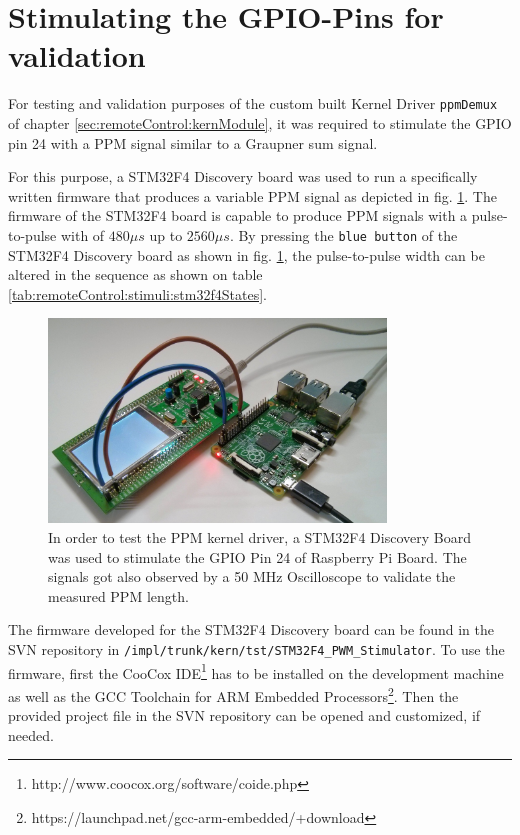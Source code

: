 \section{Stimulating the GPIO-Pins for validation}
\label{sec:remoteControl:stimuli}

For testing and validation purposes of the custom built Kernel Driver \texttt{ppmDemux} of chapter \ref{sec:remoteControl:kernModule}, it was required to stimulate the GPIO pin 24 with a PPM signal similar to a Graupner sum signal.

For this purpose, a STM32F4 Discovery board was used to run a specifically written firmware that produces a variable PPM signal as depicted in fig. \ref{fig:remoteControl:stimuli:hwSetup}. The firmware of the STM32F4 board is capable to produce PPM signals with a pulse-to-pulse with of $480\mu s$ up to $2560\mu s$. By pressing the \texttt{blue button} of the STM32F4 Discovery board as shown in fig. \ref{fig:remoteControl:stimuli:hwSetup}, the pulse-to-pulse width can be altered in the sequence as shown on table \ref{tab:remoteControl:stimuli:stm32f4States}.

\begin{figure}[H]
    \centering
    \includegraphics[width=0.80\textwidth]{fig/ch-ppm-kernel-driver/picStimulusRpi}
    \caption[Stimulating GPIO Pins of Raspberry Pi]{In order to test the PPM kernel driver, a STM32F4 Discovery Board was used to stimulate the GPIO Pin 24 of Raspberry Pi Board. The signals got also observed by a 50 MHz Oscilloscope to validate the measured PPM length.}
    \label{fig:remoteControl:stimuli:hwSetup}
\end{figure}

The firmware developed for the STM32F4 Discovery board can be found in the SVN repository in \texttt{/impl/trunk/kern/tst/STM32F4\_PWM\_Stimulator}. To use the firmware, first the CooCox IDE\footnote{http://www.coocox.org/software/coide.php} has to be installed on the development machine as well as the GCC Toolchain for ARM Embedded Processors\footnote{https://launchpad.net/gcc-arm-embedded/+download}. Then the provided project file in the SVN repository can be opened and customized, if needed.

